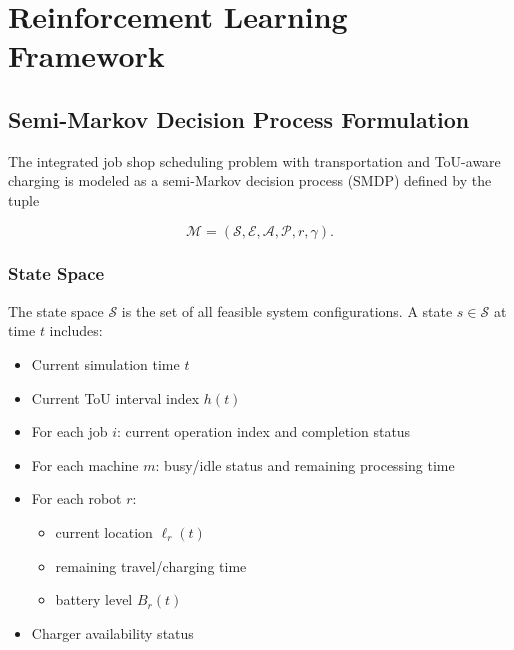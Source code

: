 \documentclass[preprint, 3p, review, 12pt]{elsarticle}
\begin{document}

\section{Reinforcement Learning Framework}

\subsection{Semi-Markov Decision Process Formulation}

The integrated job shop scheduling problem with transportation and ToU-aware charging
is modeled as a semi-Markov decision process (SMDP) defined by the tuple

\[
\mathcal{M} = (\mathcal{S}, \mathcal{E}, \mathcal{A}, \mathcal{P}, r, \gamma).
\]

\subsubsection{State Space}

The state space $\mathcal{S}$ is the set of all feasible system configurations.
A state $s \in \mathcal{S}$ at time $t$ includes:

\begin{itemize}
    \item Current simulation time $t$
    \item Current ToU interval index $h(t)$
    \item For each job $i$: current operation index and completion status
    \item For each machine $m$: busy/idle status and remaining processing time
    \item For each robot $r$:
        \begin{itemize}
            \item current location $\ell_r(t)$
            \item remaining travel/charging time
            \item battery level $B_r(t)$
        \end{itemize}
    \item Charger availability status
\end{itemize}
\end{document}
